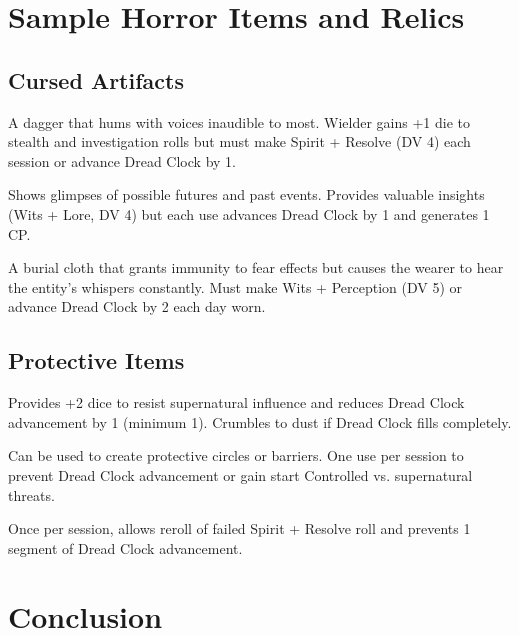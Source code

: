 \documentclass[11pt]{article}
\begin{document}
\section*{Sample Horror Items and Relics}

\subsection*{Cursed Artifacts}

\begin{description}[leftmargin=*]
\item[Whispering Blade] A dagger that hums with voices inaudible to most. Wielder gains +1 die to stealth and investigation rolls but must make Spirit + Resolve (DV 4) each session or advance Dread Clock by 1.
\item[Mirror of the Forgotten] Shows glimpses of possible futures and past events. Provides valuable insights (Wits + Lore, DV 4) but each use advances Dread Clock by 1 and generates 1 CP.
\item[Shroud of Whispers] A burial cloth that grants immunity to fear effects but causes the wearer to hear the entity's whispers constantly. Must make Wits + Perception (DV 5) or advance Dread Clock by 2 each day worn.
\end{description}

\subsection*{Protective Items}

\begin{description}[leftmargin=*]
\item[Blessed Warding Stone] Provides +2 dice to resist supernatural influence and reduces Dread Clock advancement by 1 (minimum 1). Crumbles to dust if Dread Clock fills completely.
\item[Sanctified Salt] Can be used to create protective circles or barriers. One use per session to prevent Dread Clock advancement or gain start Controlled vs. supernatural threats.
\item[Prayer Book of the Steadfast] Once per session, allows reroll of failed Spirit + Resolve roll and prevents 1 segment of Dread Clock advancement.
\end{description}

\section*{Conclusion}
\end{document}
